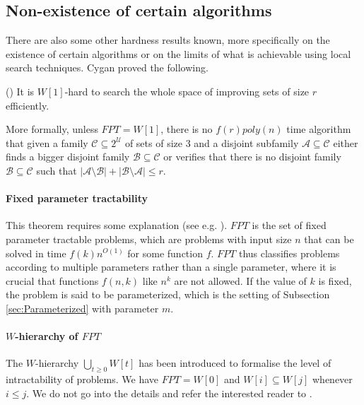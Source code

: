 \subsection{Non-existence of certain algorithms}\label{subsec:Hardness2}

There are also some other hardness results known, more specifically on the existence of certain algorithms or on the limits of what is achievable using local search techniques. Cygan \cite{Cygan} proved the following.
%
\begin{theorem}\label{thm:HardnessCygan}
(\cite[Theorem 1.1]{Cygan}) It is $W[1]$-hard to search the whole space of improving sets of size $r$ efficiently.

More formally, unless $FPT = W[1]$, there is no $f(r)poly(n)$ time algorithm that given a family $\mathcal{C} \subseteq 2^\mathcal{U}$ of sets of size 3 and a disjoint subfamily $\mathcal{A} \subseteq \mathcal{C}$ either finds a bigger disjoint family $\mathcal{B} \subseteq \mathcal{C}$ or verifies that there is no disjoint family $\mathcal{B} \subseteq \mathcal{C}$ such that $|\mathcal{A} \setminus \mathcal{B}| + |\mathcal{B} \setminus \mathcal{A}| \leq r$.
\end{theorem}
%
\paragraph{Fixed parameter tractability} This theorem requires some explanation (see e.g. \cite{FPT1,DowneyFellows}). $FPT$ is the set of fixed parameter tractable problems, which are problems with input size $n$ that can be solved in time $f(k)n^{O(1)}$ for some function $f$. $FPT$ thus classifies problems according to multiple parameters rather than a single parameter, where it is crucial that functions $f(n,k)$ like $n^k$ are not allowed. If the value of $k$ is fixed, the problem is said to be parameterized, which is the setting of Subsection \ref{sec:Parameterized} with parameter $m$. %

\paragraph{$W$-hierarchy of $FPT$} The $W$-hierarchy $\bigcup_{t \geq 0} W[t]$ has been introduced to formalise the level of intractability of problems. We have $FPT = W[0]$ and $W[i] \subseteq W[j]$ whenever $i \leq j$. We do not go into the details and refer the interested reader to \cite{FPT1,DowneyFellows}.

